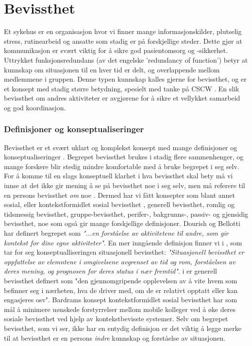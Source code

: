 \section{Bevissthet}
\label{chp: awareness}

Et sykehus er en organisasjon hvor vi finner mange informasjonskilder, plutselig stress, rutinearbeid og ansatte som stadig er på forskjellige steder. Dette gjør at kommunikasjon er svært viktig for å sikre god pasientomsorg og -sikkerhet\cite{Klemets12}. Uttrykket funksjonsredundans (av det engelske 'redundancy of function') betyr at kunnskap om situasjonen til en hver tid er delt, og overlappende mellom medlemmene i gruppen.\cite{KlemetsRedundancy} Denne typen kunnskap kalles gjerne for bevissthet, og er et konsept med stadig større betydning, spesielt med tanke på CSCW \cite{Dourish92}. En slik bevissthet om andres aktiviteter er avgjørene for å sikre et vellykket samarbeid og god koordinasjon\cite{KlemetsRedundancy}. 

\subsubsection{Definisjoner og konseptualiseringer}
Bevissthet er et svært uklart og komplekst konsept med mange definisjoner og konseptualiseringer \cite{KlemetsRedundancy}\cite{Gutwin04}\cite{Schmidt02}. Begrepet bevissthet brukes i stadig flere sammenhenger, og mange forskere blir stedig mindre komfortable med å bruke begrepet i seg selv. For å komme til en slags konseptuell klarhet i hva bevissthet skal bety må vi innse at det ikke gir mening å se på bevissthet noe i seg selv, men må referere til en persons bevissthet \emph{om} noe \cite{Schmidt02}. Dermed har vi fått konsepter som blant annet sosial, eller kontekstformidlet sosial bevissthet \cite{Bardram04}, generell bevissthet\cite{Gross13}, romlig og tidsmessig bevissthet\cite{Randell}, gruppe-bevissthet\cite{Gutwin04}, perifer-, bakgrunns-, passiv- og gjensidig bevissthet\cite{Schmidt02}, noe som også gir mange forskjellige definisjoner. Dourish og Bellotti har definert begrepet som \emph{"...en forståelse av aktivitetene til andre, som gir kontekst for dine egne aktiviteter"}. En mer inngående definisjon finner vi i \cite{Endsly95}, som tar for seg konseptualliseringen situasjonell bevissthet: \emph{"Situasjonell bevissthet er oppfattelse av elemntene i omgivelsene avgrenset av tid og rom, forståelsen av deres mening, og prognosen for deres status i nær fremtid"}. i \cite{Gross13} er generell bevissthet definert som "den gjennomgripende opplevelsen av å vite hvem som befinner seg i nærheten, hva de driver med, om de er relativt opptatt eller kan engasjeres osv". Bardrams konsept kontekstformidlet sosial bevissthet har som mål å minimere uønskede forstyrrelser mellom mobile kolleger ved å øke deres sosiale bevissthet ved hjelp av kontekstbevisste systemer\cite{Bardram04}. Selv om begrepet bevissthet, som vi ser, ikke har en entydig definisjon er det viktig å legge merke til at bevissthet er en persons \emph{indre} kunnskap og forståelse av situasjonen\cite{Gross13}. 


